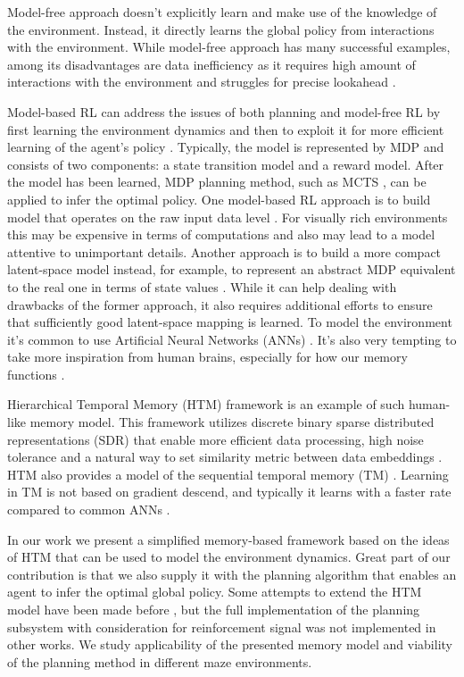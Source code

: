\documentclass[a4paper,twoside]{article}
\begin{document}
Model-free approach doesn't explicitly learn and make use of the knowledge of the environment. Instead, it directly learns the global policy from interactions with the environment. While model-free approach has many successful examples, among its disadvantages are data inefficiency as it requires high amount of interactions with the environment and struggles for precise lookahead \cite{Mnih_2015_Atari,haarnoja_2018_sac,schulman_2017_ppo}.

Model-based RL can address the issues of both planning and model-free RL by first learning the environment dynamics and then to exploit it for more efficient learning of the agent's policy \cite{moerland_2020_modelbased}. Typically, the model is represented by MDP and consists of two components: a state transition model and a reward model. After the model has been learned, MDP planning method, such as MCTS \cite{Coulom_2007_mcts}, can be applied to infer the optimal policy. One model-based RL approach is to build model that operates on the raw input data level \cite{Gorodetskiy2020,kaiser_2020_modelbased}. For visually rich environments this may be expensive in terms of computations and also may lead to a model attentive to unimportant details. Another approach is to build a more compact latent-space model instead, for example, to represent an abstract MDP equivalent to the real one in terms of state values \cite{silver_2020_muzero}. While it can help dealing with drawbacks of the former approach, it also requires additional efforts to ensure that sufficiently good latent-space mapping is learned. To model the environment it's common to use Artificial Neural Networks (ANNs) \cite{silver_2020_muzero,Ha_Schmidhuber_2018_worldmodels}. It's also very tempting to take more inspiration from human brains, especially for how our memory functions \cite{Hassabis_2017_neuro}.

Hierarchical Temporal Memory (HTM) framework \cite{George_Hawkins_2009} is an example of such human-like memory model. This framework utilizes discrete binary sparse distributed representations (SDR) that enable more efficient data processing, high noise tolerance and a natural way to set similarity metric between data embeddings \cite{Cui_Ahmad_Hawkins_2017_sdr}. HTM also provides a model of the sequential temporal memory (TM) \cite{hawkins_TM,Ahmad_Lavin_2017_data_streams}. Learning in TM is not based on gradient descend, and typically it learns with a faster rate compared to common ANNs \cite{Cui_Ahmad_Hawkins_2016_seq_learn}.

In our work we present a simplified memory-based framework based on the ideas of HTM that can be used to model the environment dynamics. Great part of our contribution is that we also supply it with the planning algorithm that enables an agent to infer the optimal global policy. Some attempts to extend the HTM model have been made before \cite{Skrynnik2016,Daylidyonok2018,Nugamanov2020}, but the full implementation of the planning subsystem with consideration for reinforcement signal was not implemented in other works. We study applicability of the presented memory model and viability of the planning method in different maze environments.
\end{document}
